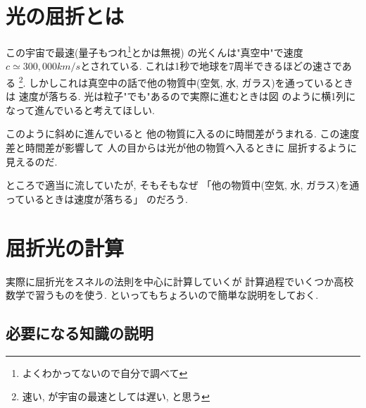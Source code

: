 \documentclass[a4paper, xelatex, ja=standard]{bxjsarticle}
\begin{document}
\section{光の屈折とは}
この宇宙で最速(量子もつれ\footnote{よくわかってないので自分で調べて}とかは無視)
の光くんは"真空中"で速度$c\simeq 300,000\si{km/s}$とされている.
これは1秒で地球を7周半できるほどの速さである
\footnote{速い, が宇宙の最速としては遅い, と思う}.
しかしこれは真空中の話で他の物質中(空気, 水, ガラス)を通っているときは
速度が落ちる.
光は粒子"でも"あるので実際に進むときは図 %
のように横1列になって進んでいると考えてほしい.

このように斜めに進んでいると
他の物質に入るのに時間差がうまれる.
この速度差と時間差が影響して
人の目からは光が他の物質へ入るときに
屈折するように見えるのだ.

ところで適当に流していたが, そもそもなぜ
「他の物質中(空気, 水, ガラス)を通っているときは速度が落ちる」
のだろう.

\section{屈折光の計算}
実際に屈折光をスネルの法則を中心に計算していくが
計算過程でいくつか高校数学で習うものを使う.
といってもちょろいので簡単な説明をしておく.

\subsection{必要になる知識の説明}
\end{document}
